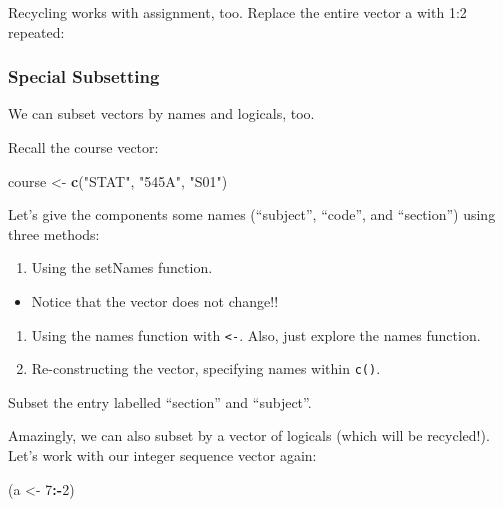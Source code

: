 \documentclass[]{article}
\newenvironment{Shaded}{\begin{snugshade}}{\end{snugshade}}
\newcommand{\KeywordTok}[1]{\textcolor[rgb]{0.13,0.29,0.53}{\textbf{#1}}}
\newcommand{\DecValTok}[1]{\textcolor[rgb]{0.00,0.00,0.81}{#1}}
\newcommand{\StringTok}[1]{\textcolor[rgb]{0.31,0.60,0.02}{#1}}
\newcommand{\OperatorTok}[1]{\textcolor[rgb]{0.81,0.36,0.00}{\textbf{#1}}}
\newcommand{\NormalTok}[1]{#1}
\providecommand{\tightlist}{%
  \setlength{\itemsep}{0pt}\setlength{\parskip}{0pt}}
\begin{document}
Recycling works with assignment, too. Replace the entire vector a with
1:2 repeated:

\subsubsection{Special Subsetting}\label{special-subsetting}

We can subset vectors by names and logicals, too.

Recall the course vector:

\begin{Shaded}
\begin{Highlighting}[]
\NormalTok{course <-}\StringTok{ }\KeywordTok{c}\NormalTok{(}\StringTok{"STAT"}\NormalTok{, }\StringTok{"545A"}\NormalTok{, }\StringTok{"S01"}\NormalTok{)}
\end{Highlighting}
\end{Shaded}

Let's give the components some names (``subject'', ``code'', and
``section'') using three methods:

\begin{enumerate}
\def\labelenumi{\arabic{enumi}.}
\tightlist
\item
  Using the setNames function.
\end{enumerate}

\begin{itemize}
\tightlist
\item
  Notice that the vector does not change!!
\end{itemize}

\begin{enumerate}
\def\labelenumi{\arabic{enumi}.}
\setcounter{enumi}{1}
\item
  Using the names function with \texttt{\textless{}-}. Also, just
  explore the names function.
\item
  Re-constructing the vector, specifying names within \texttt{c()}.
\end{enumerate}

Subset the entry labelled ``section'' and ``subject''.

Amazingly, we can also subset by a vector of logicals (which will be
recycled!). Let's work with our integer sequence vector again:

\begin{Shaded}
\begin{Highlighting}[]
\NormalTok{(a <-}\StringTok{ }\DecValTok{7}\OperatorTok{:-}\DecValTok{2}\NormalTok{)}
\end{Highlighting}
\end{Shaded}
\end{document}
